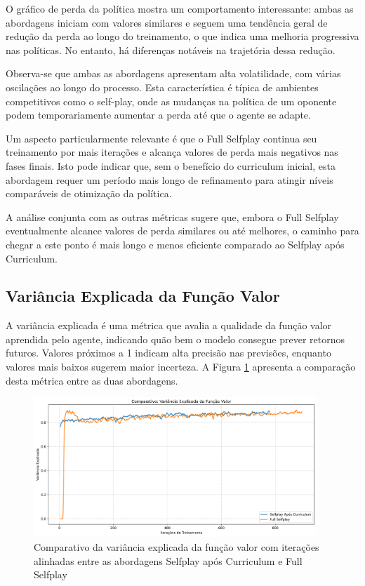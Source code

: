 O gráfico de perda da política mostra um comportamento interessante: ambas as abordagens iniciam com valores similares e seguem uma tendência geral de redução da perda ao longo do treinamento, o que indica uma melhoria progressiva nas políticas. No entanto, há diferenças notáveis na trajetória dessa redução.

Observa-se que ambas as abordagens apresentam alta volatilidade, com várias oscilações ao longo do processo. Esta característica é típica de ambientes competitivos como o self-play, onde as mudanças na política de um oponente podem temporariamente aumentar a perda até que o agente se adapte.

Um aspecto particularmente relevante é que o Full Selfplay continua seu treinamento por mais iterações e alcança valores de perda mais negativos nas fases finais. Isto pode indicar que, sem o benefício do curriculum inicial, esta abordagem requer um período mais longo de refinamento para atingir níveis comparáveis de otimização da política.

A análise conjunta com as outras métricas sugere que, embora o Full Selfplay eventualmente alcance valores de perda similares ou até melhores, o caminho para chegar a este ponto é mais longo e menos eficiente comparado ao Selfplay após Curriculum.

\subsection{Variância Explicada da Função Valor}

A variância explicada é uma métrica que avalia a qualidade da função valor aprendida pelo agente, indicando quão bem o modelo consegue prever retornos futuros. Valores próximos a 1 indicam alta precisão nas previsões, enquanto valores mais baixos sugerem maior incerteza. A Figura \ref{fig:explained_variance} apresenta a comparação desta métrica entre as duas abordagens.

\begin{figure}[H]
    \centering
    \includegraphics[width=0.95\textwidth]{fig/graficos_trabalho/graficos_experimentos/geral/comparativo_variancia_explicada.png}
    \caption{Comparativo da variância explicada da função valor com iterações alinhadas entre as abordagens Selfplay após Curriculum e Full Selfplay}
    \label{fig:explained_variance}
\end{figure}

